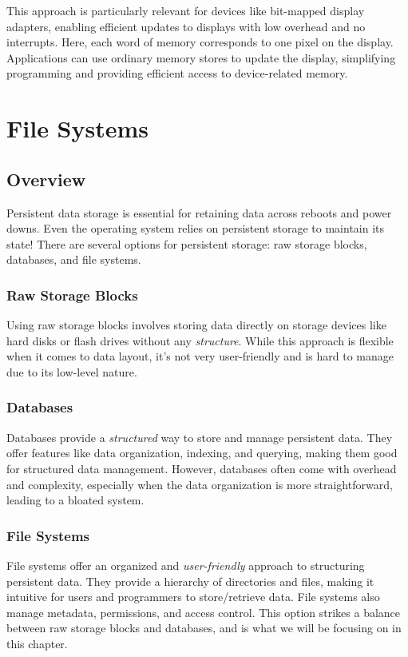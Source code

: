\documentclass{report}
\newcommand{\exampleBegin}[1]{\begin{tcolorbox}[colback=blue!5!white,colframe=black!75!blue,title={Example:
      #1}]}
\newcommand{\exampleEnd}{\end{tcolorbox}}
\begin{document}
\exampleBegin{Display Adapters}
This approach is particularly relevant for devices like bit-mapped display adapters, enabling
efficient updates to displays with low overhead and no interrupts. Here, each word of memory
corresponds to one pixel on the display. Applications can use ordinary memory stores to update the
display, simplifying programming and providing efficient access to device-related memory.
\exampleEnd










\chapter{File Systems}
\section{Overview}
Persistent data storage is essential for retaining data across reboots and power downs. Even the
operating system relies on persistent storage to maintain its state! There are several options for
persistent storage: raw storage blocks, databases, and file systems.

\subsection*{Raw Storage Blocks}
Using raw storage blocks involves storing data directly on storage devices like hard disks or flash
drives without any \textit{structure}. While this approach is flexible when it comes to data layout,
it's not very user-friendly and is hard to manage due to its low-level nature.


\subsection*{Databases}
Databases provide a \textit{structured} way to store and manage persistent data. They offer features
like data organization, indexing, and querying, making them good for structured data
management. However, databases often come with overhead and complexity, especially when the data
organization is more straightforward, leading to a bloated system.


\subsection*{File Systems}
File systems offer an organized and \textit{user-friendly} approach to structuring
persistent data. They provide a hierarchy of directories and files, making it intuitive for users
and programmers to store/retrieve data. File systems also manage metadata, permissions, and access
control. This option strikes a balance between raw storage blocks and databases, and is what we will
be focusing on in this chapter.
\end{document}
